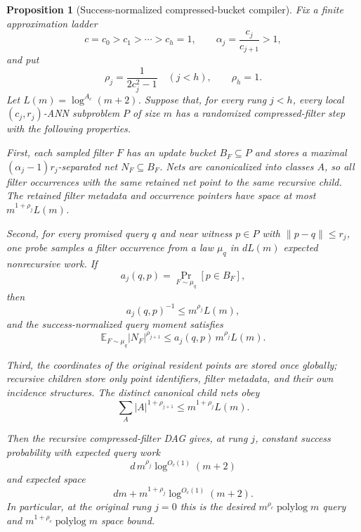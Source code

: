 \documentclass[10pt]{article}
\newtheorem{proposition}[theorem]{Proposition}
\theoremstyle{definition}
\newcommand{\E}{\mathbb{E}}
\newcommand{\polylog}{\operatorname{polylog}}
\begin{document}
\begin{proposition}[Success-normalized compressed-bucket compiler]
   \label{prop:success-normalized-bucket-dag}
   Fix a finite approximation ladder
   \[
      c=c_0>c_1>\cdots>c_h=1,
      \qquad
      \alpha_j=\frac{c_j}{c_{j+1}}>1,
   \]
   and put
   \[
      \rho_j=\frac1{2c_j^2-1}\quad(j<h),
      \qquad
      \rho_h=1 .
   \]
   Let \(L(m)=\log^{A_c}(m+2)\).  Suppose that, for every rung \(j<h\), every
   local \((c_j,r_j)\)-ANN subproblem \(P\) of size \(m\) has a randomized
   compressed-filter step with the following properties.

   First, each sampled filter \(F\) has an update bucket \(B_F\subseteq P\) and
   stores a maximal \((\alpha_j-1)r_j\)-separated net
   \(N_F\subseteq B_F\).  Nets are canonicalized into classes \(A\), so all
   filter occurrences with the same retained net point to the same recursive
   child.  The retained filter metadata and occurrence pointers have space at
   most \(m^{1+\rho_j}L(m)\).

   Second, for every promised query \(q\) and near witness \(p\in P\) with
   \(\|p-q\|\le r_j\), one probe samples a filter occurrence from a law
   \(\mu_q\) in \(dL(m)\) expected nonrecursive work.  If
   \[
      a_j(q,p)=\Pr_{F\sim\mu_q}[p\in B_F],
   \]
   then
   \[
      a_j(q,p)^{-1}\le m^{\rho_j}L(m),
      \tag{CB0}
   \]
   and the success-normalized query moment satisfies
   \[
      \E_{F\sim\mu_q}|N_F|^{\rho_{j+1}}
      \le
      a_j(q,p)\,m^{\rho_j}L(m).
      \tag{CB1}
   \]

   Third, the coordinates of the original resident points are stored once
   globally; recursive children store only point identifiers, filter metadata,
   and their own incidence structures.  The distinct canonical child nets obey
   \[
      \sum_A |A|^{1+\rho_{j+1}}
      \le
      m^{1+\rho_j}L(m).
      \tag{CB2}
   \]

   Then the recursive compressed-filter DAG gives, at rung \(j\), constant
   success probability with expected query work
   \[
      d\,m^{\rho_j}\log^{O_c(1)}(m+2)
   \]
   and expected space
   \[
      dm+m^{1+\rho_j}\log^{O_c(1)}(m+2).
   \]
   In particular, at the original rung \(j=0\) this is the desired
   \(m^{\rho_c}\polylog m\) query and \(m^{1+\rho_c}\polylog m\) space bound.
\end{proposition}
\end{document}
